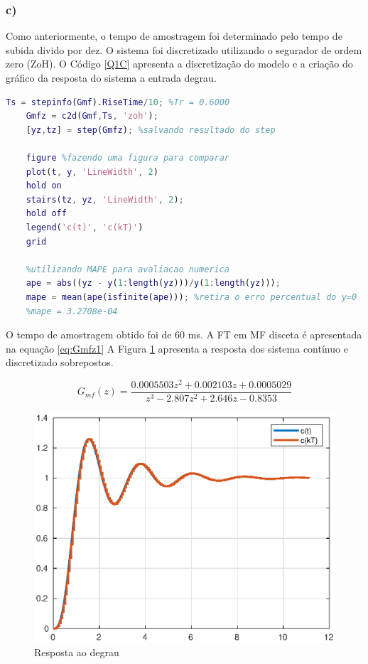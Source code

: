     \newpage    
    \subsubsection*{c)}

        Como anteriormente, o tempo de amostragem foi determinado pelo tempo de subida divido por dez. 
        O sistema foi discretizado utilizando o segurador de ordem zero (ZoH). O Código \ref{Q1C} apresenta
        a discretização do modelo e a criação do gráfico da resposta do sistema a entrada degrau.

        \begin{lstlisting}[language=Matlab,label=Q1C,caption=Análise da estabilidade]
    Ts = stepinfo(Gmf).RiseTime/10; %Tr = 0.6000
    Gmfz = c2d(Gmf,Ts, 'zoh');
    [yz,tz] = step(Gmfz); %salvando resultado do step

    figure %fazendo uma figura para comparar
    plot(t, y, 'LineWidth', 2)
    hold on
    stairs(tz, yz, 'LineWidth', 2);
    hold off
    legend('c(t)', 'c(kT)')
    grid

    %utilizando MAPE para avaliacao numerica
    ape = abs((yz - y(1:length(yz)))/y(1:length(yz))); 
    mape = mean(ape(isfinite(ape))); %retira o erro percentual do y=0
    %mape = 3.2708e-04
        \end{lstlisting}

    O tempo de amostragem obtido foi de 60 ms. A FT em MF disceta é apresentada na equação \ref{eq:Gmfz1}
    A Figura \ref{fig:Stepctds1} apresenta a resposta dos sistema
    contínuo e discretizado sobrepostos. 

    \begin{equation}
        G_{mf}(z) = \frac{0.0005503 z^2 + 0.002103 z + 0.0005029}{z^3 - 2.807 z^2 + 2.646 z - 0.8353}
        \label{eq:Gmfz1}
    \end{equation}


    \begin{figure}[!ht]
        \centering
        \includegraphics[width = 0.75\linewidth]{Figuras/ProblemasPI/Problema1/resposta_ao_degrau.eps}
        \caption{Resposta ao degrau}
        \label{fig:Stepctds1}                   
    \end{figure}

